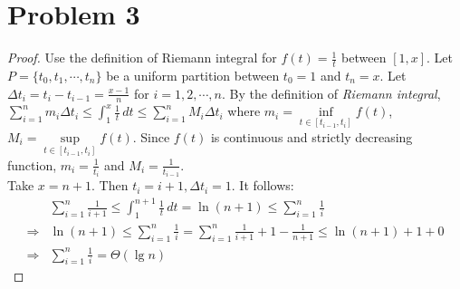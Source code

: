 \section*{Problem 3}
	\begin{proof}
		Use the definition of Riemann integral for $f(t) = \frac{1}{t}$ between $[1, x]$. Let $P = \lbrace t_0, t_1, \cdots, t_n \rbrace$ be a uniform partition between $t_0 = 1$ and $t_n = x$. Let $\Delta t_i = t_i - t_{i - 1} = \frac{x - 1}{n}$ for $i = 1, 2, \cdots, n$. By the definition of \textit{Riemann integral}, $\sum\limits_{i = 1}^{n} m_i\Delta t_i \leq \int_{1}^{x} \frac{1}{t}\, dt \leq \sum\limits_{i = 1}^{n} M_i\Delta t_i$ where $m_i = \inf\limits_{t \in [t_{i - 1}, t_i]}f(t)$, $M_i = \sup\limits_{t \in [t_{i - 1}, t_i]}f(t)$. Since $f(t)$ is continuous and strictly decreasing function, $m_i = \frac{1}{t_i}$ and $M_i = \frac{1}{t_{i - 1}}$.\\
		Take $x = n + 1$. Then $t_i = i + 1, \Delta t_i = 1$. It follows:
		\begin{align*}
			&\sum\limits_{i = 1}^{n} \frac{1}{i + 1} \leq \int_{1}^{n + 1} \frac{1}{t}\, dt = \ln{(n + 1)} \leq \sum\limits_{i = 1}^{n} \frac{1}{i}\\
			\Rightarrow & \ln{(n + 1)} \leq \sum\limits_{i = 1}^{n} \frac{1}{i} = \sum\limits_{i = 1}^{n} \frac{1}{i + 1} + 1 - \frac{1}{n + 1} \leq \ln{(n + 1)} + 1 + 0\\
			\Rightarrow & \sum\limits_{i = 1}^{n}\frac{1}{i} = \Theta(\lg n)
		\end{align*}
	\end{proof}